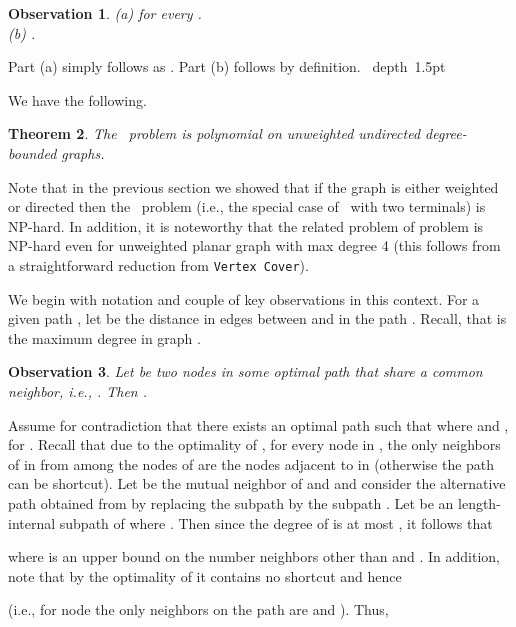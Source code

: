 \documentclass[12pt]{article}
\newtheorem{theorem}{Theorem}[section]
\newtheorem{observation}[theorem]{Observation}
\def\Proof{\par\noindent{\bf Proof:~}}
\def\blackslug{\hbox{\hskip 1pt \vrule width 4pt height 8pt
    depth 1.5pt \hskip 1pt}}
\def\QED{\quad\blackslug\lower 8.5pt\null\par}
\newcommand{\PS}[0]{ 
}
\newcommand{\PP}[0]{ }
\newcommand{\VC}[0]{\mbox{\tt Vertex Cover}}
\begin{document}
\begin{observation}
\label{obs:delta}
(a)  for every .\\
(b) .
\end{observation}
\Proof
Part (a) simply follows as . Part (b) follows by definition.
\QED
We have the following.
\begin{theorem}
\label{thm:bounded_deg_poly}
The \PP\ problem is \emph{polynomial} on unweighted undirected degree-bounded graphs.
\end{theorem}
Note that in the previous section we showed that if the graph is either weighted or directed then the \PP\ problem (i.e., the special case of \PS\ with two terminals) is NP-hard. In addition, it is noteworthy that the related problem of  problem \cite{YuanVJ05, HassinMS07}  is NP-hard even for unweighted planar graph with max degree 4 (this follows from a straightforward reduction from \VC).

We begin with notation and couple of key observations in this context.
For a given path , let  be the distance in edges between  and  in the path . Recall, that  is the maximum degree in graph .
\begin{observation}
\label{obs:opt_path_common}
Let  be two nodes in some optimal  path  that share a common neighbor, i.e., . Then .
\end{observation}
\Proof
Assume for contradiction that there exists an optimal  path  such that
 where  and ,  for .
Recall that due to the optimality of , for every node  in , the only neighbors of  in  from among the nodes of  are the nodes adjacent to  in  (otherwise the path can be shortcut). Let  be the mutual neighbor of  and  and consider the alternative  path  obtained from  by replacing the subpath  by the subpath . Let  be an length- internal subpath of  where . Then since the  degree of  is at most , it follows that

where  is an upper bound on the number  neighbors other than  and .
In addition, note that by the optimality of  it contains no shortcut and hence

(i.e., for node  the only neighbors on the path  are  and ).
Thus,
\end{document}
